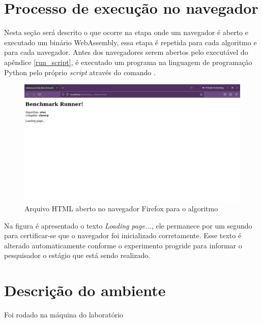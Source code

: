 \section{Processo de execução no navegador}\label{execucao}

Nesta seção será descrito o que ocorre na etapa onde um navegador é aberto e executado um binário WebAssembly, essa etapa é repetida para cada algoritmo e para cada navegador. Antes dos navegadores serem abertos pelo executável do apêndice \ref{run_script}, é executado um programa na linguagem de programação Python pelo próprio \textit{script} através do comando . 

\begin{figure}[h]
    \centering
    \includegraphics[scale=0.3]{images/html_firefox.png}
    \caption{Arquivo HTML aberto no navegador Firefox para o algoritmo }
    \label{fig:html}
\end{figure}

Na figura é apresentado o texto \textit{Loading page...}, ele permanece por um segundo para certificar-se que o navegador foi inicializado corretamente. Esse texto é alterado automaticamente conforme o experimento progride para informar o pesquisador o estágio que está sendo realizado.
 
\section{Descrição do ambiente}

Foi rodado na máquina do laboratório

